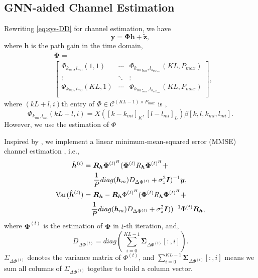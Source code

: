 \documentclass[journal]{IEEEtran}
\begin{document}
\subsection{GNN-aided Channel Estimation}
Rewriting \eqref{eq:sys-DD} for channel estimation, we have
\begin{equation}
\bm y = \bm\Phi \bm h + \bm{\tilde{z}},
\label{eq:GCHE-sys}
\end{equation}
where $\bm h$ is the path gain in the time domain,  
\[
\begin{split}
& \bm\Phi = \\
& \begin{bmatrix}
    \Phi_{k_{m0}, l_{m0}}(1, 1) & \cdots & \Phi_{k_{mP_{max}}, l_{k_{mP_{max}}}}(KL, P_{max}) \\ 
	\vdots & \ddots  & \vdots \\  
    \Phi_{k_{m0}, l_{m0}}(KL, 1) & \cdots & \Phi_{k_{mP_{max}}, l_{k_{mP_{max}}}}(KL, P_{max}) \\
\end{bmatrix},
\end{split}
\]
where $(kL+l, i)$th entry of $\Phi \in \mathcal{C}^{(KL-1)\times P_{max}}$ is \cite{9785832},
\begin{dmath}
\Phi_{k_{mi}, l_{mi}}(kL+l, i) = X([k-k_{mi}]_K, [l-l_{mi}]_L)\beta[k, l, k_{mi}, l_{mi}].
\end{dmath}
However, we use the estimation of $\Phi$



Inspired by \cite{945004, 5493831}, we implement a linear minimum-mean-squared
error (MMSE) channel estimation , i.e.,
\begin{subequations}
\begin{align}
\hat{\bm h}^{(t)} = & \hspace{0.3em} \bm R_{\bm h}\bm\Phi^{(t)^H}(\bm \Phi^{(t)}R_{\bm h}\bm\Phi^{(t)^H}\bm + \notag \\
& \hspace{0.3em} \frac{1}{P} diag(\bm h_m) D_{\Delta \Phi^{(t)}} +\sigma_z^2\bm I)^{-1}\bm y, \label{eq:GCHE-mean} \\
\text{Var}(\hat{\bm h}^{(t)}) = & \hspace{0.3em} \bm R_{\bm h} - \bm R_{\bm h}\Phi^{(t)^H} (\bm \Phi^{(t)} R_{\bm h} \bm\Phi^{(t)^{H}}\bm + \notag\\
\hspace{0.3em}& \frac{1}{P} diag(\bm h_m) D_{\Delta \Phi^{(t)}} +\sigma_z^2\bm I))^{-1} \Phi^{(t)}\bm R_{\bm h} \label{eq:GCHE-var}, \\
\end{align}
\end{subequations}
where $\bm\Phi^{(t)}$ is the estimation of $\bm\Phi$ in $t$-th iteration, and,
\begin{equation}
D_{\Delta \Phi^{(t)}} = diag(\sum_{i=0}^{KL-1}\bm \Sigma_{\Delta \Phi^{(t)}}[:, i]).
\end{equation}
$\Sigma_{\Delta\Phi^{(t)}}$ denotes the variance matrix of $\Phi^{(t)}$, and $\sum_{i=0}^{KL-1}\bm \Sigma_{\Delta \Phi^{(t)}}[:, i]$ means we sum all columns of $\Sigma_{\Delta\Phi^{(t)}}$ together to build a column vector.
\end{document}
